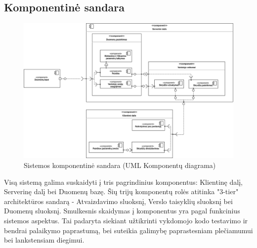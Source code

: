 \documentclass{VUMIFPSkursinis}
\begin{document}
      \subsection{Komponentinė sandara}
        \begin{figure}[H]
          \centering
          \includegraphics[scale=0.45]{img/Komponentai}
          \caption{Sistemos komponentinė sandara (UML Komponentų diagrama)}
          \label{components}
        \end{figure}
        Visą sistemą galima suskaidyti į tris pagrindinius komponentus: Klientinę dalį, Serverinę dalį bei Duomenų bazę. Šių trijų komponentų rolės atitinka "3-tier" architektūros sandarą - Atvaizdavimo sluoksnį, Verslo taisyklių sluoksnį bei Duomenų sluoksnį. Smulkesnis skaidymas į komponentus yra pagal funkcinius sistemos aspektus. Tai padaryta siekiant užtikrinti vykdomojo kodo testavimo ir bendrai palaikymo paprastumą, bei suteikia galimybę paprastesniam plečiamumui bei lankstensiam diegimui. 
\end{document}
